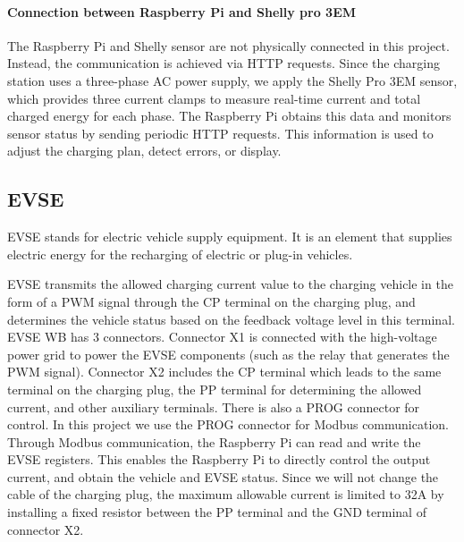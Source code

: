 \documentclass[
english,
ruledheaders=section,%
class=report,%
thesis={type=Report},%
accentcolor=9c,%
custommargins=true,%
marginpar=false,%
parskip=half-,%
fontsize=11pt,%
logofile={img/tuda_logo.pdf}, %
]{tudapub}
\begin{document}
    \paragraph{Connection between Raspberry Pi and Shelly pro 3EM}
    The Raspberry Pi and Shelly sensor are not physically connected in this project. Instead, the communication is achieved via HTTP requests. Since the charging station uses a three-phase AC power supply, we apply the Shelly Pro 3EM sensor, which provides three current clamps to measure real-time current and total charged energy for each phase. The Raspberry Pi obtains this data and monitors sensor status by sending periodic HTTP requests. This information is used to adjust the charging plan, detect errors, or display.
    \subsection{EVSE}
    \label{subsec:EVSE}
    EVSE stands for electric vehicle supply equipment. It is an element that supplies electric
    energy for the recharging of electric or plug-in vehicles.

    EVSE transmits the allowed charging current value to the charging vehicle in the form of a PWM signal through the CP terminal on the charging plug, and determines the vehicle status based on the feedback voltage level in this terminal. EVSE WB has 3 connectors. Connector X1 is connected with the high-voltage power grid to power the EVSE components (such as the relay that generates the PWM signal). Connector X2 includes the CP terminal which leads to the same terminal on the charging plug, the PP terminal for determining the allowed current, and other auxiliary terminals. There is also a PROG connector for control. In this project we use the PROG connector for Modbus communication. Through Modbus communication, the Raspberry Pi can read and write the EVSE registers. This enables the Raspberry Pi to directly control the output current, and obtain the vehicle and EVSE status. Since we will not change the cable of the charging plug, the maximum allowable current is limited to 32A by installing a fixed resistor between the PP terminal and the GND terminal of connector X2.
\end{document}
